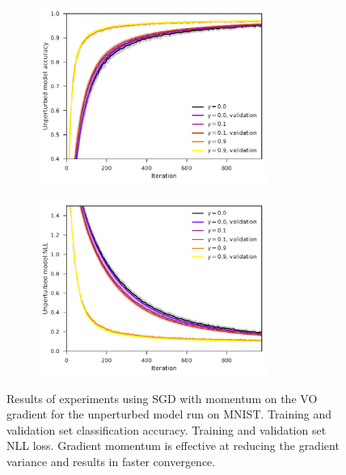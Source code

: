 \begin{figure}[tbp!]
    \begin{subfigure}[b]{0.49\textwidth}
        \centering
        \includegraphics[height=5.8cm]{graphics/E030-MOM-S-analysis/accuracy_unp-all-series-mean-sd.pdf}
        \caption{}
        \label{fig: Theory: E030-MOM-S-analysis/accuracy_unp-all-series-mean-sd}
    \end{subfigure}
    \hfill
    \begin{subfigure}[b]{0.49\textwidth}
        \centering
        \includegraphics[height=5.8cm]{graphics/E030-MOM-S-analysis/return_unp-all-series-mean-sd.pdf}
        \caption{}
        \label{fig: Theory: E030-MOM-S-analysis/return_unp-all-series-mean-sd}
    \end{subfigure}
    \caption{
        Results of experiments using \gls{SGD} with momentum on the \gls{VO} gradient for the unperturbed model run on \gls{MNIST}.
         Training and validation set classification accuracy.
         Training and validation set \gls{NLL} loss.
        Gradient momentum is effective at reducing the gradient variance and results in faster convergence.
    }
    \label{fig: Theory: E030-MOM-S-analysis}
\end{figure}


